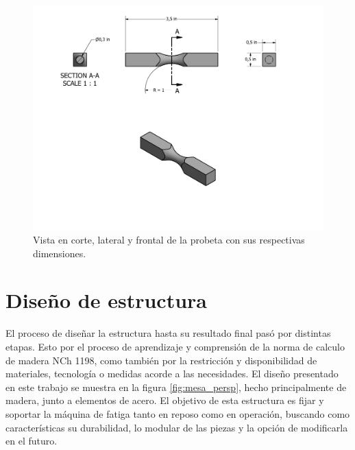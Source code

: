\begin{figure}[H]
\centering
\includegraphics[width=1\linewidth, trim={2cm 13cm 4cm 1cm},clip]{Imagenes/Probeta.pdf}
\caption{Vista en corte, lateral y frontal de la probeta con sus respectivas dimensiones.}
\label{fig:probeta}
\end{figure} 
 
\section{Diseño de estructura}
El proceso de diseñar la estructura hasta su resultado final pasó por distintas etapas. Esto por el proceso de aprendizaje y comprensión de la norma de calculo de madera NCh 1198, como también por la restricción y disponibilidad de materiales, tecnología o medidas acorde a las necesidades. El diseño presentado en este trabajo se muestra en la figura \ref{fig:mesa_persp}, hecho principalmente de madera, junto a elementos de acero. El objetivo de esta estructura es fijar y soportar la máquina de fatiga tanto en reposo como en operación, buscando como características su durabilidad, lo modular de las piezas y la opción de modificarla en el futuro.

